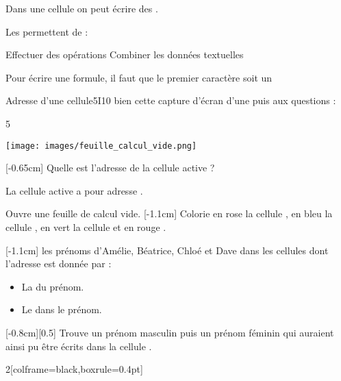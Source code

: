 \begin{Definition}[Formule]
    Dans une cellule on peut écrire des . 
    
     Les  permettent de :
    {
        \begin{crep}[extra lines=2]
            \begin{tcbenumerate}[2]
                \tcbitem Effectuer des opérations
                \tcbitem Combiner les données textuelles
            \end{tcbenumerate}
        \end{crep}
    }    

         Pour écrire une formule, il faut que le premier caractère soit un \repsim{=}
\end{Definition}

\begin{EXO}{Adresse d'une cellule}{5I10}
 bien cette capture d'écran d'une  puis  aux questions :

\begin{MultiColonnes}{5}
    \tcbitem[raster multicolumn=3] \begin{center}
    \texttt{[image: images/feuille\_calcul\_vide.png]}
\end{center}
    \tcbitem[raster multicolumn=2] \begin{tcbenumerate}
        \tcbitem {}[-0.65cm] Quelle est l'adresse de la cellule active ? 
        \begin{crep}
            La cellule active a pour adresse .
        \end{crep}
        \tcbitem Ouvre une feuille de calcul vide.
        \tcbitem {}[-1.1cm] Colorie en rose la cellule , en bleu la cellule , en vert la cellule  et en rouge .
    \end{tcbenumerate}
\end{MultiColonnes}


\begin{tcbenumerate}[2][4]
    \tcbitem {}[-1.1cm]  les prénoms d'Amélie, Béatrice, Chloé et Dave dans les cellules dont l'adresse est donnée par : 
    \begin{itemize}[label=\bcoeil]
        \item La  du prénom.
        \item Le  dans le prénom. 
    \end{itemize}
    \tcbitem {}[-0.8cm][0.5] Trouve un prénom masculin puis un prénom féminin qui auraient ainsi pu être écrits dans la cellule .
    \begin{MultiColonnes}{2}[colframe=black,boxrule=0.4pt]
        \tcbitem[title=Prénom masculin] 
        \tcbitem[title=Prénom féminin] 
    \end{MultiColonnes}
\end{tcbenumerate}
\end{EXO}